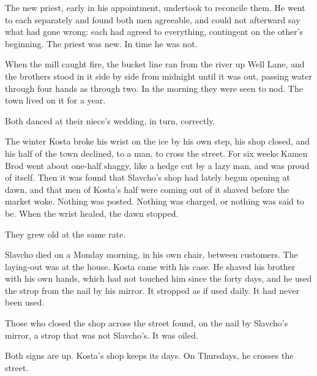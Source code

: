 \documentclass[11pt]{article}
\begin{document}
The new priest, early in his appointment, undertook to reconcile them. He went to each separately and found both men agreeable, and could not afterward say what had gone wrong: each had agreed to everything, contingent on the other's beginning. The priest was new. In time he was not.

When the mill caught fire, the bucket line ran from the river up Well Lane, and the brothers stood in it side by side from midnight until it was out, passing water through four hands as through two. In the morning they were seen to nod. The town lived on it for a year.

Both danced at their niece's wedding, in turn, correctly.

The winter Kosta broke his wrist on the ice by his own step, his shop closed, and his half of the town declined, to a man, to cross the street. For six weeks Kamen Brod went about one-half shaggy, like a hedge cut by a lazy man, and was proud of itself. Then it was found that Slavcho's shop had lately begun opening at dawn, and that men of Kosta's half were coming out of it shaved before the market woke. Nothing was posted. Nothing was charged, or nothing was said to be. When the wrist healed, the dawn stopped.

They grew old at the same rate.

Slavcho died on a Monday morning, in his own chair, between customers. The laying-out was at the house. Kosta came with his case. He shaved his brother with his own hands, which had not touched him since the forty days, and he used the strop from the nail by his mirror. It stropped as if used daily. It had never been used.

Those who closed the shop across the street found, on the nail by Slavcho's mirror, a strop that was not Slavcho's. It was oiled.

Both signs are up. Kosta's shop keeps its days. On Thursdays, he crosses the street.
\end{document}
